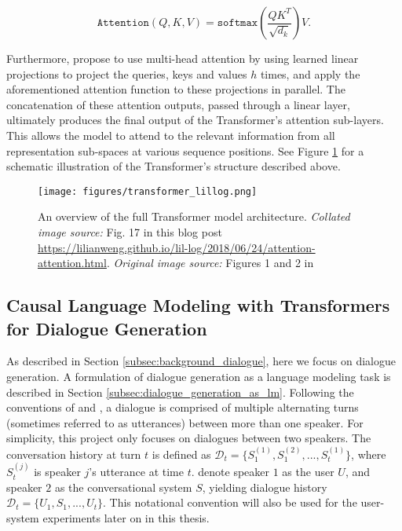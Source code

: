 \begin{equation}
    \texttt{Attention}(Q, K, V) = \texttt{softmax} \left( \frac{QK^T}{\sqrt{d_k}}\right) V.
\end{equation}

Furthermore, \cite{vaswani2017attention} propose to use multi-head attention by using learned linear projections to project the queries, keys and values $h$ times, and apply the aforementioned attention function to these projections in parallel. The concatenation of these attention outputs, passed through a linear layer, ultimately produces the final output of the Transformer's attention sub-layers. This allows the model to attend to the relevant information from all representation sub-spaces at various sequence positions. See Figure \ref{fig:transformer_architecture} for a schematic illustration of the Transformer's structure described above.


\begin{figure}[H]
    \centering
    \texttt{[image: figures/transformer\_lillog.png]}
    \caption{An overview of the full Transformer model architecture. \textit{Collated image source:} Fig. 17 in this blog post \url{https://lilianweng.github.io/lil-log/2018/06/24/attention-attention.html}. \textit{Original image source:} Figures 1 and 2 in \cite{vaswani2017attention}}
    \label{fig:transformer_architecture}
\end{figure}

\subsection{Causal Language Modeling with Transformers for Dialogue Generation}
As described in Section \ref{subsec:background_dialogue}, here we focus on dialogue generation. A formulation of dialogue generation as a language modeling task is described in Section \ref{subsec:dialogue_generation_as_lm}. Following the conventions of \cite{dathathri2019plug} and \cite{madotto-etal-2020-plug}, a dialogue is comprised of multiple alternating turns (sometimes referred to as utterances) between more than one speaker. For simplicity, this project only focuses on dialogues between two speakers. The conversation history at turn $t$ is defined as $\mathcal{D}_t = \{S^{(1)}_1, S^{(2)}_1, ..., S^{(1)}_t\}$, where $S^{(j)}_t$ is speaker $j$'s utterance at time $t$. \cite{madotto-etal-2020-plug} denote speaker $1$ as the user $U$, and speaker $2$ as the conversational system $S$, yielding dialogue history $\mathcal{D}_t = \{U_1, S_1, ..., U_t\}$. This notational convention will also be used for the user-system experiments later on in this thesis.

